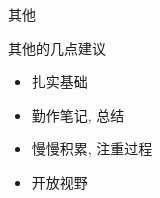 \documentclass[dvipdfm]{beamer}
\begin{document}

\begin{frame}[t]{其他}
  \begin{block}{其他的几点建议}
    \begin{itemize}
    \item 扎实基础
    \item 勤作笔记, 总结
    \item 慢慢积累, 注重过程
    \item 开放视野
    \end{itemize}
  \end{block}
\end{frame}

\end{document}
